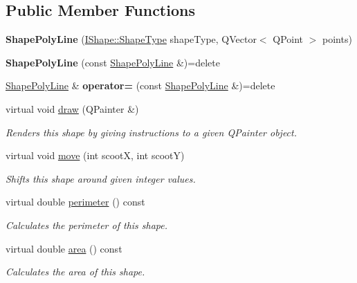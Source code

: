 \subsection*{Public Member Functions}
\begin{DoxyCompactItemize}
\item 
\mbox{\label{class_shape_poly_line_ad791dac03e16988066b2e8e074fed381}} 
{\bfseries Shape\+Poly\+Line} (\mbox{\hyperlink{class_i_shape_a8f50993477b5ddb44c0547ef3d547cdc}{I\+Shape\+::\+Shape\+Type}} shape\+Type, Q\+Vector$<$ Q\+Point $>$ points)
\item 
\mbox{\label{class_shape_poly_line_a86ba6279c0c0fae57568d7696442c271}} 
{\bfseries Shape\+Poly\+Line} (const \mbox{\hyperlink{class_shape_poly_line}{Shape\+Poly\+Line}} \&)=delete
\item 
\mbox{\label{class_shape_poly_line_a57631de758dda4361bc5c8317ae88a85}} 
\mbox{\hyperlink{class_shape_poly_line}{Shape\+Poly\+Line}} \& {\bfseries operator=} (const \mbox{\hyperlink{class_shape_poly_line}{Shape\+Poly\+Line}} \&)=delete
\item 
virtual void \mbox{\hyperlink{class_shape_poly_line_a6aaca4bd2767644f9ea0f68065fa1f98}{draw}} (Q\+Painter \&)
\begin{DoxyCompactList}\small\item\em Renders this shape by giving instructions to a given Q\+Painter object. \end{DoxyCompactList}\item 
virtual void \mbox{\hyperlink{class_shape_poly_line_a7c1971596b171c4c08ec5657b6592354}{move}} (int scootX, int scootY)
\begin{DoxyCompactList}\small\item\em Shifts this shape around given integer values. \end{DoxyCompactList}\item 
virtual double \mbox{\hyperlink{class_shape_poly_line_a3d6664ada9c9dd883303a3dcb63d6188}{perimeter}} () const
\begin{DoxyCompactList}\small\item\em Calculates the perimeter of this shape. \end{DoxyCompactList}\item 
virtual double \mbox{\hyperlink{class_shape_poly_line_ace9d3c1eefec00364034dc420262c91e}{area}} () const
\begin{DoxyCompactList}\small\item\em Calculates the area of this shape. \end{DoxyCompactList}\end{DoxyCompactItemize}
